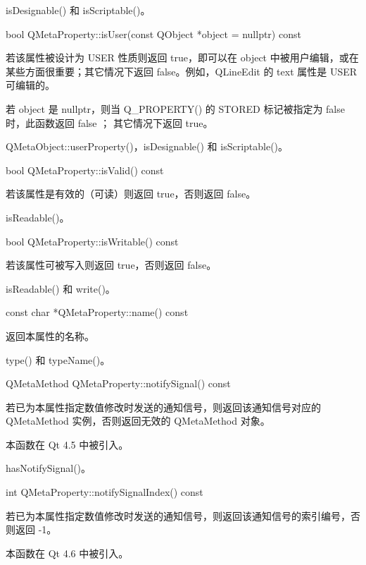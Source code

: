 \begin{seeAlso}
isDesignable() 和 isScriptable()。
\end{seeAlso}

bool QMetaProperty::isUser(const QObject *object = nullptr) const

若该属性被设计为 USER 性质则返回 true，即可以在 object 中被用户编辑，或在某些方面很重要；其它情况下返回 false。例如，QLineEdit 的 text 属性是 USER 可编辑的。

若 object 是 nullptr，则当 Q\_PROPERTY() 的 STORED 标记被指定为 false时，此函数返回 false ；
其它情况下返回 true。

\begin{seeAlso}
QMetaObject::userProperty()，isDesignable() 和 isScriptable()。
\end{seeAlso}

bool QMetaProperty::isValid() const

若该属性是有效的（可读）则返回 true，否则返回 false。

\begin{seeAlso}
isReadable()。
\end{seeAlso}

bool QMetaProperty::isWritable() const

若该属性可被写入则返回 true，否则返回 false。

\begin{seeAlso}
isReadable() 和 write()。
\end{seeAlso}

const char *QMetaProperty::name() const

返回本属性的名称。

\begin{seeAlso}
type() 和 typeName()。
\end{seeAlso}

QMetaMethod QMetaProperty::notifySignal() const

若已为本属性指定数值修改时发送的通知信号，则返回该通知信号对应的 QMetaMethod 实例，否则返回无效的 QMetaMethod 对象。

本函数在 Qt 4.5 中被引入。

\begin{seeAlso}
hasNotifySignal()。
\end{seeAlso}

int QMetaProperty::notifySignalIndex() const

若已为本属性指定数值修改时发送的通知信号，则返回该通知信号的索引编号，否则返回 -1。

本函数在 Qt 4.6 中被引入。

